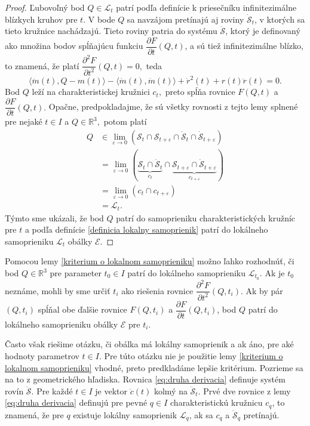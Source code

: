 \begin{proof}
Ľubovoľný bod $Q \in \mathcal{L}_{t}$ patrí podľa definície k priesečníku infinitezimálne blízkych kruhov pre $t$. V bode $Q$ sa navzájom pretínajú aj roviny $\mathcal{\dot{S}}_t$, v ktorých sa tieto kružnice nachádzajú. Tieto roviny patria do systému $\mathcal{\dot{S}}$, ktorý je definovaný ako množina bodov spĺňajúcu funkciu $\dfrac{\partial F}{\partial t}(Q, t)$, a sú tiež infinitezimálne blízko, to znamená, že platí $\dfrac{\partial^2 F}{\partial t^2}(Q,t) = 0, $ teda
\begin{equation}
\label{eq:druha derivacia}
\langle \ddot{m}(t), Q-m(t) \rangle - \langle \dot{m}(t), \dot{m}(t) \rangle + \dot{r}^2(t) + r(t)\ddot{r}(t) = 0. 
\end{equation}
Bod $Q$ leží na charakteristickej kružnici $c_{t},$ preto spĺňa rovnice $F (Q, t)$ a $\dfrac{\partial F}{\partial t}(Q, t).$
Opačne, predpokladajme, že sú všetky rovnosti z tejto lemy splnené pre nejaké $t \in I$ a $Q \in \mathbb{R}^3, $ potom platí
\begin{align*}
Q &\in \lim_{\varepsilon \to 0} \left( \mathcal{S}_t \cap \mathcal{S}_{t + \varepsilon} \cap \mathcal{\dot{S}}_t \cap \mathcal{\dot{S}}_{t + \varepsilon} \right) \\
&= \lim_{\varepsilon \to 0} \left( \underbrace{\mathcal{S}_t \cap \mathcal{\dot{S}}_t}_{c_{t}} \cap \underbrace{\mathcal{S}_{t + \varepsilon} \cap \mathcal{\dot{S}}_{t + \varepsilon}}_{c_{t + \varepsilon}} \right) 
\\
&= \lim_{\varepsilon \to 0} \left( {c_{t}} \cap {c_{t+ \varepsilon}} \right) \\
&= \mathcal{L}_{t}.
\end{align*}
Týmto sme ukázali, že bod $Q$ patrí do samoprieniku charakteristických kružníc pre $t$ a podľa definície \ref{definicia lokalny samoprienik} patrí do lokálneho samoprieniku $\mathcal{L}_{t}$ obálky $\mathcal{E}$.
\end{proof}

Pomocou lemy \ref{kriterium o lokalnom samoprieniku} možno ľahko rozhodnúť, či bod $Q \in \mathbb{R}^3$ pre parameter $t_0 \in I$ patrí do lokálneho samoprieniku $\mathcal{L}_{t_0}.$ Ak je $t_0$ neznáme, mohli by sme určiť $t_i$ ako riešenia rovnice $\dfrac{\partial^2 F}{\partial t^2}(Q, t_i)$. Ak by pár $(Q, t_i)$ spĺňal obe ďalšie rovnice $F(Q, t_i)$ a $ \dfrac{\partial F}{\partial t}(Q, t_i)$, bod $Q$ patrí do lokálneho samoprieniku obálky $\mathcal{E}$ pre $t_i.$

Často však riešime otázku, či obálka má lokálny samoprienik a ak áno, pre aké hodnoty parametrov $t \in I$. Pre túto otázku nie je použitie lemy \ref{kriterium o lokalnom samoprieniku} vhodné, preto predkladáme lepšie kritérium. Pozrieme sa na to z geometrického hľadiska. Rovnica \ref{eq:druha derivacia} definuje systém rovín $\mathcal{\ddot{S}}$. Pre každé $t \in I$ je vektor $\ddot{c}(t)$ kolmý na $\mathcal{\ddot{S}}_t.$ Prvé dve rovnice z lemy \ref{eq:druha derivacia} definujú pre pevné $q \in I$ charakteristickú kružnicu $c_q$, to znamená, že pre $q$ existuje lokálny samoprienik $\mathcal{L}_q$, ak sa $c_q$ a $\mathcal{\ddot{S}}_q$ pretínajú. 

